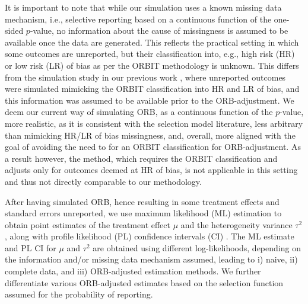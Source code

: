 \documentclass[twocolumn]{article}\usepackage[]{graphicx}\usepackage[]{xcolor}
\begin{document}
It is important to note that while our simulation uses a known missing data mechanism, i.e., selective reporting based on a continuous function of the one-sided $p$-value, no information about the cause of missingness is assumed to be available once the data are generated. This reflects the practical setting in which some outcomes are unreported, but their classification into, e.g., high risk (HR) or low risk (LR) of bias as per the ORBIT methodology is unknown. This differs from the simulation study in our previous work \citep{mythesis}, where unreported outcomes were simulated mimicking the ORBIT classification into HR and LR of bias, and this information was assumed to be available prior to the ORB-adjustment. We deem our current way of simulating ORB, as a continuous function of the $p$-value, more realistic, as it is consistent with the selection model literature, less arbitrary than mimicking HR/LR of bias missingness, and, overall, more aligned with the goal of avoiding the need to for an ORBIT classification for ORB-adjustment. As a result however, the \citet{Copas2019} method, which requires the ORBIT classification and adjusts only for outcomes deemed at HR of bias, is not applicable in this setting and thus not directly comparable to our methodology.

After having simulated ORB, hence resulting in some treatment effects and standard errors unreported, we use maximum likelihood (ML) estimation to obtain point estimates of the treatment effect $\mu$ and the heterogeneity variance $\tau^2$, along with profile likelihood (PL) confidence intervals (CI) \citep{tauCI, Copas2019, likelihood}. The ML estimate and PL CI for $\mu$ and $\tau^2$ are obtained using different log-likelihoods, depending on the information and/or missing data mechanism assumed, leading to i) naive, ii) complete data, and iii) ORB-adjusted estimation methods. We further differentiate various ORB-adjusted estimates based on the selection function assumed for the probability of reporting.
\end{document}
